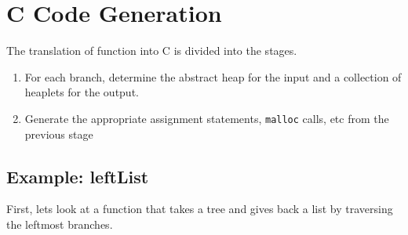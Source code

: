\section{C Code Generation}

The translation of \PikaCore{} function into C is divided into the stages.

\begin{enumerate}
  \item \label{stage:in-out} For each branch, determine the abstract heap for the input and a collection of
    heaplets for the output.
  \item Generate the appropriate assignment statements, \verb|malloc| calls, etc from the
    previous stage
\end{enumerate}

\subsection{Example: leftList}
First, lets look at a \Pika{} function that takes a tree and gives back a list by traversing the leftmost branches.

